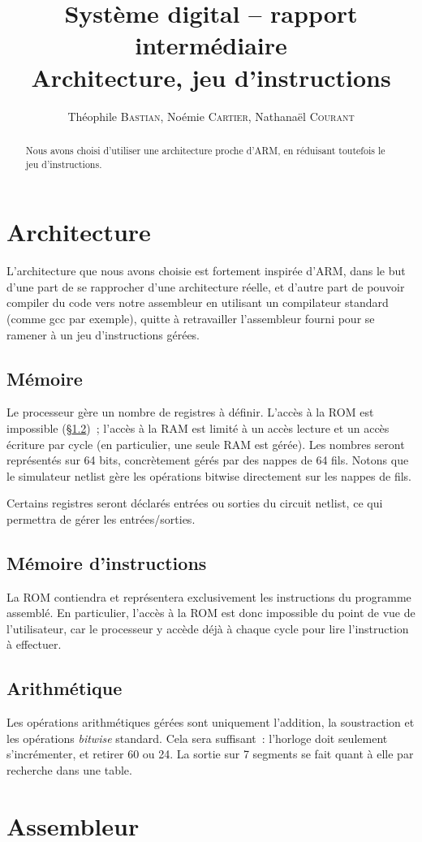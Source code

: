 \documentclass[11pt,a4paper]{article}
\author{Théophile \textsc{Bastian}, Noémie \textsc{Cartier}, Nathanaël \textsc{Courant}}
\title{Système digital -- rapport intermédiaire\\{\large Architecture, jeu d'instructions}}
\begin{document}
\maketitle

\begin{abstract}
Nous avons choisi d'utiliser une architecture proche d'ARM, en réduisant toutefois le jeu d'instructions.
\end{abstract}

\section{Architecture}

L'architecture que nous avons choisie est fortement inspirée d'ARM, dans le but d'une part de se rapprocher d'une architecture réelle, et d'autre part de pouvoir compiler du code vers notre assembleur en utilisant un compilateur standard (comme gcc par exemple), quitte à retravailler l'assembleur fourni pour se ramener à un jeu d'instructions gérées.

\subsection{Mémoire}

Le processeur gère un nombre de registres à définir. L'accès à la ROM est impossible (§\ref{ssec:mem_instruct})~; l'accès à la RAM est limité à un accès lecture et un accès écriture par cycle (en particulier, une seule RAM est gérée). Les nombres seront représentés sur 64 bits, concrètement gérés par des nappes de 64 fils. Notons que le simulateur netlist gère les opérations bitwise directement sur les nappes de fils.

Certains registres seront déclarés entrées ou sorties du circuit netlist, ce qui permettra de gérer les entrées/sorties.

\subsection{Mémoire d'instructions}\label{ssec:mem_instruct}

La ROM contiendra et représentera exclusivement les instructions du programme assemblé. En particulier, l'accès à la ROM est donc impossible du point de vue de l'utilisateur, car le processeur y accède déjà à chaque cycle pour lire l'instruction à effectuer.

\subsection{Arithmétique}

Les opérations arithmétiques gérées sont uniquement l'addition, la soustraction et les opérations \emph{bitwise} standard. Cela sera suffisant~: l'horloge doit seulement s'incrémenter, et retirer 60 ou 24. La sortie sur 7 segments se fait quant à elle par recherche dans une table.

\section{Assembleur}
\end{document}
